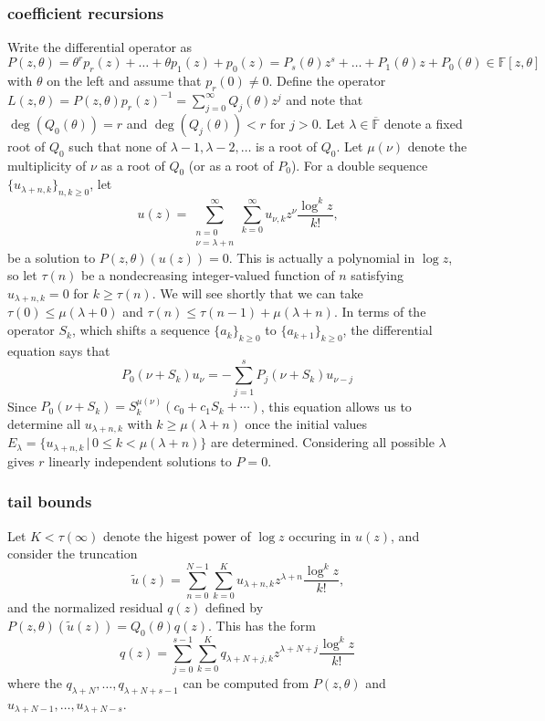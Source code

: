 \documentclass[12pt]{article}
\numberwithin{equation}{section}
\begin{document}
\subsubsection{coefficient recursions}
Write the differential operator as $P(z,\theta) = \theta^r p_r(z) + \dots + \theta p_1(z) + p_0(z) = P_s(\theta) z^s + \dots + P_1(\theta) z + P_0(\theta) \in\mathbb{F}[z,\theta]$ with $\theta$ on the left and assume that $p_r(0) \neq 0$. Define the operator $L(z,\theta) = P(z,\theta) p_r(z)^{-1} = \sum_{j=0}^{\infty} Q_j(\theta) z^j$ and note that $\deg(Q_0(\theta)) = r$ and $\deg(Q_j(\theta)) < r$ for $j > 0$. Let $\lambda \in \overline{\mathbb{F}}$ denote a fixed root of $Q_0$ such that none of $\lambda-1, \lambda-2, \dots$ is a root of $Q_0$. Let $\mu(\nu)$ denote the multiplicity of $\nu$ as a root of $Q_0$ (or as a root of $P_0$). For a double sequence $\{u_{\lambda + n, k}\}_{n,k \ge 0}$, let
\begin{equation*}
u(z) = \sum_{\substack{n=0 \\ \nu=\lambda+n}}^{\infty} \sum_{k=0}^{\infty} u_{\nu,k} z^{\nu} \frac{\log^k z}{k!}\text{,}
\end{equation*}
be a solution to $P(z,\theta)(u(z)) = 0$. This is actually a polynomial in $\log z$, so let $\tau(n)$ be a nondecreasing integer-valued function of $n$ satisfying 
$u_{\lambda+n, k} = 0$ for $k \ge \tau(n)$. We will see shortly that we can take $\tau(0) \le \mu(\lambda + 0)$ and $\tau(n) \le \tau(n-1)+\mu(\lambda+n)$. In terms of the operator $S_k$, which shifts a sequence $\{a_k\}_{k \ge 0}$ to $\{a_{k+1}\}_{k \ge 0}$, the differential equation says that
\begin{equation*}
P_0(\nu + S_k) u_{\nu} = - \sum_{j=1}^{s} P_j(\nu + S_k) u_{\nu - j}
\end{equation*}
Since $P_0(\nu + S_k) = S_k^{\mu(\nu)}( c_0 + c_1 S_k + \cdots )$, this equation allows us to determine all $u_{\lambda+n, k}$ with $k \ge \mu(\lambda+n)$ once the initial values $E_{\lambda} = \{u_{\lambda+n, k} \, | \, 0 \le k < \mu(\lambda+n)\}$ are determined. Considering all possible $\lambda$ gives $r$ linearly independent solutions to $P=0$.

\subsubsection{tail bounds}
Let $K < \tau(\infty)$ denote the higest power of $\log z$ occuring in $u(z)$, and consider the truncation
\begin{equation*}
\tilde{u}(z) = \sum_{n=0}^{N-1} \sum_{k=0}^{K} u_{\lambda + n,k} z^{\lambda + n} \frac{\log^k z}{k!}\text{,}
\end{equation*}
and the normalized residual $q(z)$ defined by $P(z,\theta)(\tilde{u}(z)) = Q_0(\theta) q(z)$. This has the form
\begin{equation*}
q(z) = \sum_{j=0}^{s-1} \sum_{k = 0}^{K} q_{\lambda + N + j, k} z^{\lambda + N + j} \frac{\log^k z}{k!}
\end{equation*}
where the $q_{\lambda+N}, \dots, q_{\lambda+N+s-1}$ can be computed from $P(z,\theta)$ and $u_{\lambda+N-1}, \dots, u_{\lambda+N-s}$.
\end{document}
